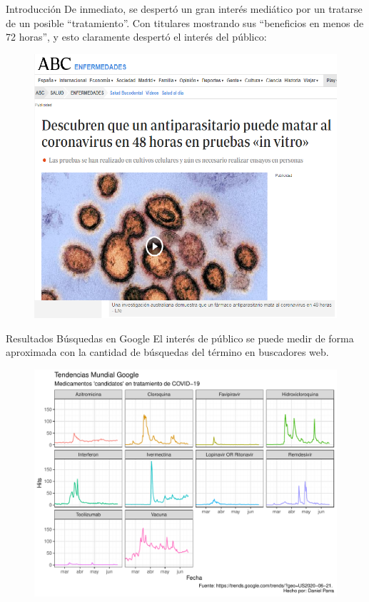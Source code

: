 \documentclass[12pt]{beamer}
\begin{document}
	\begin{frame}{Introducción}
		\small De inmediato, se despertó un gran interés mediático por un tratarse de un posible ``tratamiento''. Con titulares mostrando sus ``beneficios en menos de 72 horas'', y esto claramente despertó el interés del público:

		\begin{figure}
			\centering\includegraphics[width=0.7\linewidth]{figs/titular_1}
			\label{fig:titular1}
		\end{figure}
	\end{frame}

	\begin{frame}{Resultados Búsquedas en Google}		
		\scriptsize El interés de público se puede medir de forma aproximada con la cantidad de búsquedas del término en buscadores web. 
		\begin{figure}
			\centering
			\includegraphics[width=0.8\linewidth]{../../6_Google_Trends/figures/G2_2020-06-21}
			\label{fig:g1col2020-06-21}
		\end{figure}
	\end{frame}
\end{document}
